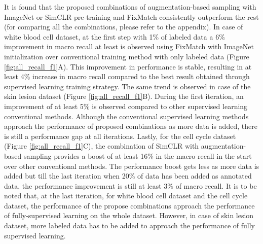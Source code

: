 It is found that the proposed combinations of augmentation-based sampling with ImageNet or SimCLR pre-training and FixMatch consistently outperform the rest (for comparing all the combinations, please refer to the appendix).
In case of white blood cell dataset, at the first step with 1\% of labeled data a 6\% improvement in macro recall at least is observed using FixMatch with ImageNet initialization over conventional training method with only labeled data (Figure \ref{fig:all_recall_f1}A). This improvement in performance is stable, resulting in at least 4\% increase in macro recall compared to the best result obtained through supervised learning training strategy. The same trend is observed in case of the skin lesion dataset (Figure \ref{fig:all_recall_f1}B). During the first iteration, an improvement of at least 5\% is observed compared to other supervised learning conventional methods. Although the conventional supervised learning methods approach the performance of proposed combinations as more data is added, there is still a performance gap at all iterations. Lastly, for the cell cycle dataset (Figure \ref{fig:all_recall_f1}C), the combination of SimCLR with augmentation-based sampling provides a boost of at least 16\% in the macro recall in the start over other conventional methods. The performance boost gets less as more data is added but till the last iteration when 20\% of data has been added as annotated data, the performance improvement is still at least 3\% of macro recall. 
It is to be noted that, at the last iteration, for white blood cell dataset and the cell cycle dataset, the performance of the propose combinations approach the performance of fully-supervised learning on the whole dataset. However, in case of skin lesion dataset, more labeled data has to be added to approach the performance of fully supervised learning. 

